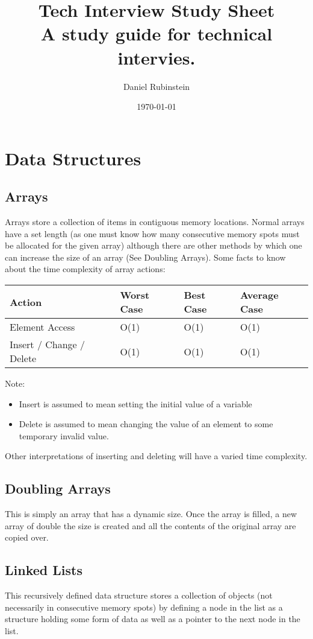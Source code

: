 \documentclass[11pt]{article}
\author{Daniel Rubinstein}
\date{\today}
\title{Tech Interview Study Sheet\\\medskip
\large A study guide for technical intervies.}
\begin{document}
\maketitle

\section*{Data Structures}
\label{sec:orgf7796ff}
\subsection*{Arrays}
\label{sec:orge60915a}
Arrays store a collection of items in contiguous memory locations.
Normal arrays have a set length (as one must know how many consecutive memory spots must be allocated for the given array) although there are other methods by which one can increase the size of an array (See Doubling Arrays).
Some facts to know about the time complexity of array actions:
\begin{center}
\begin{tabular}{llll}
Action & Worst Case & Best Case & Average Case\\
\hline
Element Access & O(1) & O(1) & O(1)\\
Insert / Change / Delete & O(1) & O(1) & O(1)\\
\end{tabular}
\end{center}

Note:
\begin{itemize}
\item Insert is assumed to mean setting the initial value of a variable
\item Delete is assumed to mean changing the value of an element to some temporary invalid value.
\end{itemize}
Other interpretations of inserting and deleting will have a varied time complexity.

\subsection*{Doubling Arrays}
\label{sec:org120b56d}
This is simply an array that has a dynamic size. Once the array is filled, a new array of double the size is created and all the contents of the original array are copied over.

\subsection*{Linked Lists}
\label{sec:orgbb772e3}
This recursively defined data structure stores a collection of objects (not necessarily in consecutive memory spots) by defining a node in the list as a structure holding some form of data as well as a pointer to the next node in the list.
\end{document}
